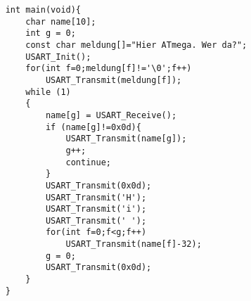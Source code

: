 \begin{verbatim}
    int main(void){
        char name[10];
        int g = 0;
        const char meldung[]="Hier ATmega. Wer da?";
        USART_Init();
        for(int f=0;meldung[f]!='\0';f++)
            USART_Transmit(meldung[f]);
        while (1) 
        {
            name[g] = USART_Receive();
            if (name[g]!=0x0d){
                USART_Transmit(name[g]);
                g++;
                continue;	
            }
            USART_Transmit(0x0d);
            USART_Transmit('H');
            USART_Transmit('i');
            USART_Transmit(' ');
            for(int f=0;f<g;f++)
                USART_Transmit(name[f]-32);
            g = 0;
            USART_Transmit(0x0d);
        }
    }
    \end{verbatim}